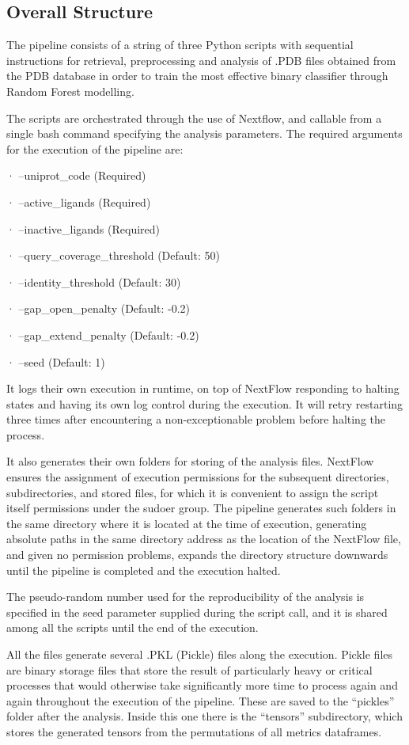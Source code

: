 \documentclass{article}
\begin{document}
\subsection{Overall Structure}

The pipeline consists of a string of three Python scripts with sequential instructions for retrieval, preprocessing and analysis of .PDB files obtained from the PDB database in order to train the most effective binary classifier through Random Forest modelling. 

The scripts are orchestrated through the use of Nextflow, and callable from a single bash command specifying the analysis parameters. The required arguments for the execution of the pipeline are:

· --uniprot\_code (Required)

· --active\_ligands (Required)

· --inactive\_ligands (Required)

· --query\_coverage\_threshold (Default: 50)

· --identity\_threshold (Default: 30)

· --gap\_open\_penalty (Default: -0.2)

· --gap\_extend\_penalty (Default: -0.2)

· --seed (Default: 1)

 It logs their own execution in runtime, on top of NextFlow responding to halting states and having its own log control during the execution. It will retry restarting three times after encountering a non-exceptionable problem before halting the process. 

It also generates their own folders for storing of the analysis files. NextFlow ensures the assignment of execution permissions for the subsequent directories, subdirectories, and stored files, for which it is convenient to assign the script itself permissions under the sudoer group. The pipeline generates such folders in the same directory where it is located at the time of execution, generating absolute paths in the same directory address as the location of the NextFlow file, and given no permission problems, expands the directory structure downwards until the pipeline is completed and the execution halted.

The pseudo-random number used for the reproducibility of the analysis is specified in the seed parameter supplied during the script call, and it is shared among all the scripts until the end of the execution. 

All the files generate several .PKL (Pickle) files along the execution. Pickle files are binary storage files that store the result of particularly heavy or critical processes that would otherwise take significantly more time to process again and again throughout the execution of the pipeline. These are saved to the “pickles” folder after the analysis. Inside this one there is the “tensors” subdirectory, which stores the generated tensors from the permutations of all metrics dataframes.
\end{document}
